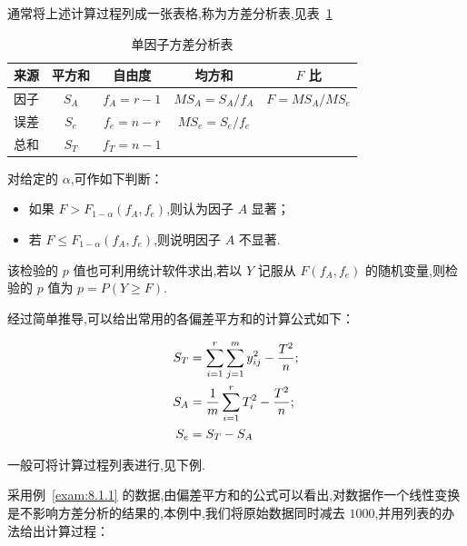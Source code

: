 通常将上述计算过程列成一张表格,称为方差分析表,见表~\ref{tab:8.1.3}

\begin{table}[htbp]
\centering
\caption{单因子方差分析表\label{tab:8.1.3}}
\begin{tabular}{ccccc}
\toprule
来源 & 平方和 & 自由度 & 均方和 & $F$ 比\\
\midrule
因子 & $S_A$ & $f_{A} = r-1$ & $MS_{A} = S_{A}/f_A$ & $F = MS_{A}/MS_{e}$ \\
误差 & $S_{e}$ & $f_{e} = n - r$ & $MS_{e} = S_e/f_e$ & \\
\midrule
总和 & $S_{T}$ & $f_{T} = n - 1$ & & \\
\bottomrule 
\end{tabular}
\end{table}

对给定的 $\alpha$,可作如下判断：
\begin{itemize}
\item 如果 $F > F_{1-\alpha}(f_A,f_e)$,则认为因子 $A$ 显著；
\item 若 $F \leq F_{1-\alpha}(f_A, f_e)$,则说明因子 $A$ 不显著.
\end{itemize}
该检验的 $p$ 值也可利用统计软件求出,若以 $Y$ 记服从 $F(f_A,f_e)$ 的随机变量,则检验的 $p$ 值为 $p = P(Y \geq F)$.

经过简单推导,可以给出常用的各偏差平方和的计算公式如下：

\begin{align}
S_T &= \sum_{i=1}^{r}\sum_{j=1}^{m} y_{ij}^2 - \frac{T^2}{n}; \notag\\
S_A &= \frac{1}{m} \sum_{i=1}^{r} T_{i}^2 - \frac{T^2}{n}; \label{eq:8.1.19}\\
S_e &= S_T - S_A \notag
\end{align}

一般可将计算过程列表进行,见下例.

\begin{example}\label{exam:8.1.2}
采用例~\ref{exam:8.1.1} 的数据,由偏差平方和的公式可以看出,对数据作一个线性变换是不影响方差分析的结果的,本例中,我们将原始数据同时减去 $1000$,并用列表的办法给出计算过程：
\end{example}

